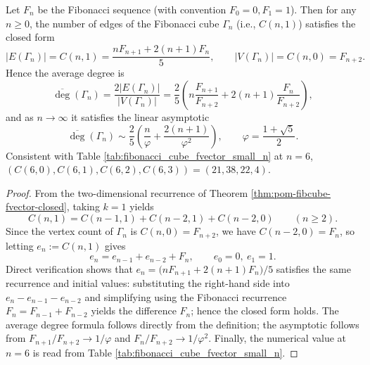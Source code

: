 \begin{corollary}\label{cor:pom-fibcube-edge-closed-form}
Let \(F_n\) be the Fibonacci sequence (with convention \(F_0=0,F_1=1\)).
Then for any \(n\ge 0\), the number of edges of the Fibonacci cube \(\Gamma_n\) (i.e., \(C(n,1)\)) satisfies the closed form
\[
|E(\Gamma_n)|=C(n,1)=\frac{nF_{n+1}+2(n+1)F_n}{5},
\qquad
|V(\Gamma_n)|=C(n,0)=F_{n+2}.
\]
Hence the average degree is
\[
\overline{\deg}(\Gamma_n)
=\frac{2|E(\Gamma_n)|}{|V(\Gamma_n)|}
=\frac{2}{5}\left(
n\frac{F_{n+1}}{F_{n+2}}+2(n+1)\frac{F_n}{F_{n+2}}
\right),
\]
and as \(n\to\infty\) it satisfies the linear asymptotic
\[
\overline{\deg}(\Gamma_n)
\sim
\frac{2}{5}\left(\frac{n}{\varphi}+\frac{2(n+1)}{\varphi^2}\right),
\qquad
\varphi=\frac{1+\sqrt5}{2}.
\]
Consistent with Table \ref{tab:fibonacci_cube_fvector_small_n} at \(n=6\),
\(
(C(6,0),C(6,1),C(6,2),C(6,3))=(21,38,22,4)
\).
\end{corollary}
\begin{proof}
From the two-dimensional recurrence of Theorem \ref{thm:pom-fibcube-fvector-closed}, taking \(k=1\) yields
\[
C(n,1)=C(n-1,1)+C(n-2,1)+C(n-2,0)\qquad(n\ge 2).
\]
Since the vertex count of \(\Gamma_n\) is \(C(n,0)=F_{n+2}\), we have \(C(n-2,0)=F_n\), so letting \(e_n:=C(n,1)\) gives
\[
e_n=e_{n-1}+e_{n-2}+F_n,\qquad e_0=0,\ e_1=1.
\]
Direct verification shows that
\(
e_n=\bigl(nF_{n+1}+2(n+1)F_n\bigr)/5
\)
satisfies the same recurrence and initial values: substituting the right-hand side into \(e_n-e_{n-1}-e_{n-2}\) and simplifying using the Fibonacci recurrence \(F_n=F_{n-1}+F_{n-2}\)
yields the difference \(F_n\);
hence the closed form holds.
The average degree formula follows directly from the definition; the asymptotic follows from \(F_{n+1}/F_{n+2}\to 1/\varphi\) and \(F_n/F_{n+2}\to 1/\varphi^2\).
Finally, the numerical value at \(n=6\) is read from Table \ref{tab:fibonacci_cube_fvector_small_n}.
\end{proof}



